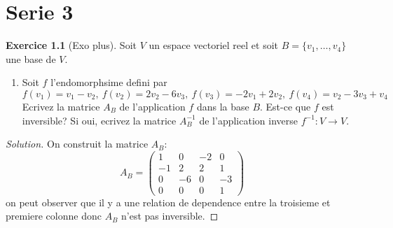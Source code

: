 \documentclass[a4paper,11pt,french]{report}
\theoremstyle{plain}
\theoremstyle{definition}
\newtheorem{exercise}{Exercice}[chapter]
\begin{document}
\chapter{Serie 3}

\begin{exercise}[Exo plus]
Soit $V$ un espace vectoriel reel et soit $B=\{ v_{1},\dots,v_{4} \}$ une base de $V$.
\begin{enumerate}
\item Soit $f$ l'endomorphsime defini par
$$
f(v_{1})=v_{1}-v_{2},~f(v_{2})=2v_{2}-6v_{3},~f(v_{3})=-2v_{1}+2v_{2},~f(v_{4})=v_{2}-3v_{3}+v_{4}
$$
Ecrivez la matrice $A_{B}$ de l'application $f$ dans la base $B$. Est-ce que $f$ est inversible? Si oui, ecrivez la matrice $A^{-1}_{B}$ de l'application inverse $f^{-1}:V\to V$.
\end{enumerate}
\end{exercise}
\begin{proof}[Solution]
On construit la matrice $A_{B}$:
$$
A_{B}=\begin{pmatrix}
1 & 0 & -2 & 0 \\
-1 & 2 & 2 & 1 \\
0 & -6 & 0 & -3 \\
0 & 0 & 0 & 1
\end{pmatrix}
$$
on peut observer que il y a une relation de dependence entre la troisieme et premiere colonne donc $A_{B}$ n'est pas inversible.
\end{proof}
\end{document}
